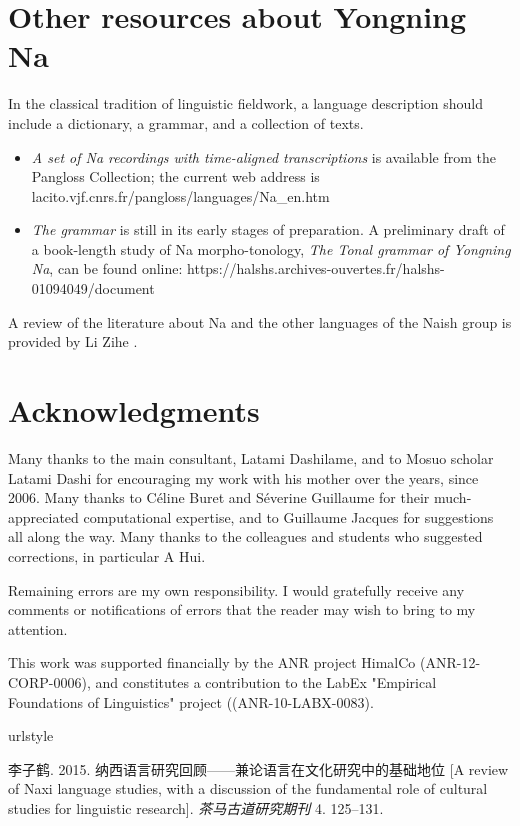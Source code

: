 	\section{Other resources about Yongning Na} \label{sec:resources}
	
	In the classical tradition of linguistic fieldwork, a language description should include a dictionary, a grammar, and a collection of texts. 
	
	\begin{itemize}
		\item \textit{A set of Na recordings with time-aligned transcriptions} is available from the Pangloss Collection; the current web address is lacito.vjf.cnrs.fr/pangloss/languages/Na\_en.htm 
		\item \textit{The grammar} is still in its early stages of preparation. A preliminary draft of a book-length study of Na morpho-tonology, \textit{The Tonal grammar of Yongning Na}, can be found online: https://halshs.archives-ouvertes.fr/halshs-01094049/document
	\end{itemize}
	
A review of the literature about Na and the other languages of the Naish  group is provided by Li Zihe \citet{李子鹤2015}.


	\section{Acknowledgments} \label{sec:ackno}

Many thanks to the main consultant, Latami Dashilame, and to Mosuo scholar Latami Dashi for encouraging my work with his mother over the years, since 2006. Many thanks to Céline Buret and Séverine Guillaume for their much-appreciated computational expertise, and to Guillaume Jacques for suggestions all along the way. Many thanks to the colleagues and students who suggested corrections, in particular A Hui.

Remaining errors are my own responsibility. I would gratefully receive any comments or notifications of errors that the reader may wish to bring to my attention.

This work was supported financially by the ANR project HimalCo (ANR-12-CORP-0006), and constitutes a contribution to the LabEx "Empirical Foundations of Linguistics" project ((ANR-10-LABX-0083).

\begin{thebibliography}{1}
\providecommand{\natexlab}[1]{#1}
\providecommand{\url}[1]{#1}
\providecommand{\urlprefix}{}
\expandafter\ifx\csname urlstyle\endcsname\relax
\providecommand{\doi}[1]{doi:\discretionary{}{}{}#1}\else
\providecommand{\doi}{doi:\discretionary{}{}{}\begingroup
\urlstyle{rm}\Url}\fi

李子鹤. 2015.
\newblock
  纳西语言研究回顾------兼论语言在文化研究中的基础地位
  [{A} review of {Naxi} language studies, with a discussion of the fundamental
  role of cultural studies for linguistic research].
\newblock \emph{茶马古道研究期刊} 4. 125--131.

\end{thebibliography}
